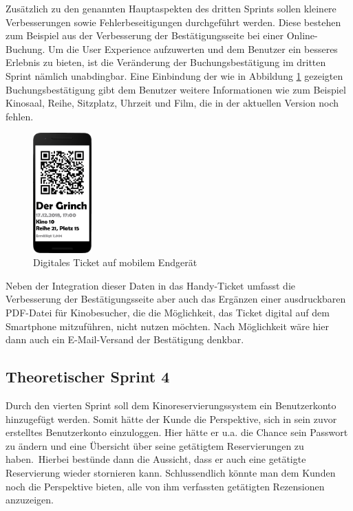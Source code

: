 Zusätzlich zu den genannten Hauptaspekten des dritten Sprints sollen kleinere Verbesserungen sowie Fehlerbeseitigungen durchgeführt werden.
Diese bestehen zum Beispiel aus der Verbesserung der Bestätigungsseite bei einer Online-Buchung.
Um die User Experience aufzuwerten und dem Benutzer ein besseres Erlebnis zu bieten, ist die Veränderung der Buchungsbestätigung im dritten Sprint nämlich unabdingbar.
Eine Einbindung der wie in Abbildung \ref{fig:ticket_phone} gezeigten Buchungsbestätigung gibt dem Benutzer weitere Informationen wie zum Beispiel Kinosaal, Reihe, Sitzplatz, Uhrzeit und Film, die in der aktuellen Version noch fehlen.

\begin{figure}[ht]
	\centering
	\includegraphics[width=0.2\textwidth]{img/ticket_phone}
	\captionsetup{format=hang}
	\caption{Digitales Ticket auf mobilem Endgerät}
	\label{fig:ticket_phone}
\end{figure}

Neben der Integration dieser Daten in das Handy-Ticket umfasst die Verbesserung der Bestätigungsseite aber auch das Ergänzen einer ausdruckbaren PDF-Datei für Kinobesucher, die die Möglichkeit, das Ticket digital auf dem Smartphone mitzuführen, nicht nutzen möchten.
Nach Möglichkeit wäre hier dann auch ein E-Mail-Versand der Bestätigung denkbar.

\subsection{Theoretischer Sprint 4}
\label{ssssec:sprint_benuterkonto}
\authorsection{\authorSG}
Durch den vierten Sprint soll dem Kinoreservierungssystem ein Benutzerkonto hinzugefügt werden.
Somit hätte der Kunde die Perspektive, sich in sein zuvor erstelltes Benutzerkonto einzuloggen.
Hier hätte er u.a. die Chance sein Passwort zu ändern und eine Übersicht über seine getätigtem Reservierungen zu haben.\
Hierbei bestünde dann die Aussicht, dass er auch eine getätigte Reservierung wieder stornieren kann.
Schlussendlich könnte man dem Kunden noch die Perspektive bieten, alle von ihm verfassten getätigten Rezensionen anzuzeigen.

